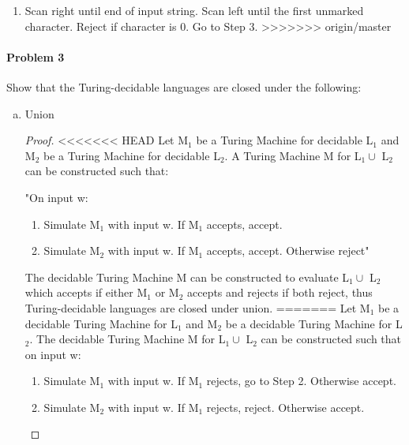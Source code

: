 ﻿\documentclass{article}
\begin{document}
\begin{enumerate}[a)]
\begin{enumerate}[1)]
\begin{enumerate}[(3.a)]
    \item Scan right until end of input string. Scan left until the first unmarked character. Reject if character is 0. Go to Step 3. 
>>>>>>> origin/master
    

    \end{enumerate}
    


\end{enumerate}


\paragraph{Problem 3} Show that the Turing-decidable languages are closed under the following:
\begin{enumerate}[a)]

\item Union

\begin{proof}

<<<<<<< HEAD
Let M$_{1}$ be a Turing Machine for decidable L$_{1}$ and M$_{2}$ be a Turing Machine for decidable L$_{2}$. A Turing Machine M for L$_{1} \cup$ L$_{2}$ can be constructed such that:

"On input w:

\begin{enumerate} [1.]
\item Simulate M$_{1}$ with input w. If M$_{1}$ accepts, accept.
\item Simulate M$_{2}$ with input w. If M$_{1}$ accepts, accept. Otherwise reject"
\end{enumerate}

The decidable Turing Machine M can be constructed to evaluate L$_{1} \cup$ L$_{2}$ which accepts if either M$_{1}$ or M$_{2}$ accepts and rejects if both reject, thus Turing-decidable languages are closed under union.
=======
Let M$_{1}$ be a decidable Turing Machine for L$_{1}$ and M$_{2}$ be a decidable Turing Machine for L$_{2}$. The decidable Turing Machine M for L$_{1} \cup$ L$_{2}$ can be constructed such that on input w:

\begin{enumerate} [1.]
\item Simulate M$_{1}$ with input w. If M$_{1}$ rejects, go to Step 2. Otherwise accept.
\item Simulate M$_{2}$ with input w. If M$_{1}$ rejects, reject. Otherwise accept.
\end{enumerate}


\end{proof}
\end{enumerate}
\end{enumerate}
\end{document}
